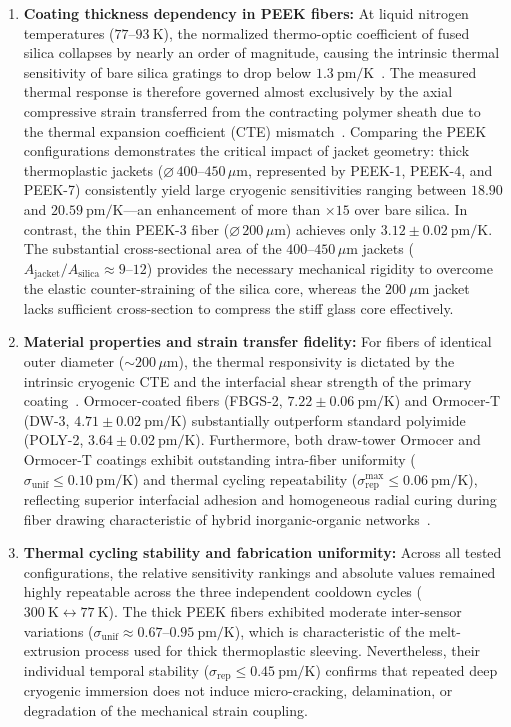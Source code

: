 \documentclass[12pt]{article}
\begin{document}
\begin{enumerate}
    \item \textbf{Coating thickness dependency in PEEK fibers:} At liquid nitrogen temperatures ($77$--$93~\text{K}$), the normalized thermo-optic coefficient of fused silica collapses by nearly an order of magnitude, causing the intrinsic thermal sensitivity of bare silica gratings to drop below $1.3~\text{pm/K}$~\cite{Lupi2008,Salin2008,Rajan2013}. The measured thermal response is therefore governed almost exclusively by the axial compressive strain transferred from the contracting polymer sheath due to the thermal expansion coefficient (CTE) mismatch~\cite{Rajan2013,NIST_CryoMaterials}. Comparing the PEEK configurations demonstrates the critical impact of jacket geometry: thick thermoplastic jackets ($\varnothing\,400$--$450\,\mu\text{m}$, represented by PEEK-1, PEEK-4, and PEEK-7) consistently yield large cryogenic sensitivities ranging between $18.90$ and $20.59~\text{pm/K}$—an enhancement of more than $\times 15$ over bare silica. In contrast, the thin PEEK-3 fiber ($\varnothing\,200\,\mu\text{m}$) achieves only $3.12 \pm 0.02~\text{pm/K}$. The substantial cross-sectional area of the $400$--$450\,\mu\text{m}$ jackets ($A_{\text{jacket}}/A_{\text{silica}} \approx 9$--$12$) provides the necessary mechanical rigidity to overcome the elastic counter-straining of the silica core, whereas the $200~\mu\text{m}$ jacket lacks sufficient cross-section to compress the stiff glass core effectively.

    \item \textbf{Material properties and strain transfer fidelity:} For fibers of identical outer diameter ($\sim 200\,\mu\text{m}$), the thermal responsivity is dictated by the intrinsic cryogenic CTE and the interfacial shear strength of the primary coating~\cite{Zhao2007,NIST_CryoMaterials}. Ormocer-coated fibers (FBGS-2, $7.22 \pm 0.06~\text{pm/K}$) and Ormocer-T (DW-3, $4.71 \pm 0.02~\text{pm/K}$) substantially outperform standard polyimide (POLY-2, $3.64 \pm 0.02~\text{pm/K}$). Furthermore, both draw-tower Ormocer and Ormocer-T coatings exhibit outstanding intra-fiber uniformity ($\sigma_{\text{unif}} \le 0.10~\text{pm/K}$) and thermal cycling repeatability ($\sigma_{\text{rep}}^{\max} \le 0.06~\text{pm/K}$), reflecting superior interfacial adhesion and homogeneous radial curing during fiber drawing characteristic of hybrid inorganic-organic networks~\cite{Popall1998}.

    \item \textbf{Thermal cycling stability and fabrication uniformity:} Across all tested configurations, the relative sensitivity rankings and absolute values remained highly repeatable across the three independent cooldown cycles ($300~\text{K} \leftrightarrow 77~\text{K}$). The thick PEEK fibers exhibited moderate inter-sensor variations ($\sigma_{\text{unif}} \approx 0.67$--$0.95~\text{pm/K}$), which is characteristic of the melt-extrusion process used for thick thermoplastic sleeving. Nevertheless, their individual temporal stability ($\sigma_{\text{rep}} \le 0.45~\text{pm/K}$) confirms that repeated deep cryogenic immersion does not induce micro-cracking, delamination, or degradation of the mechanical strain coupling.
\end{enumerate}
\end{document}
